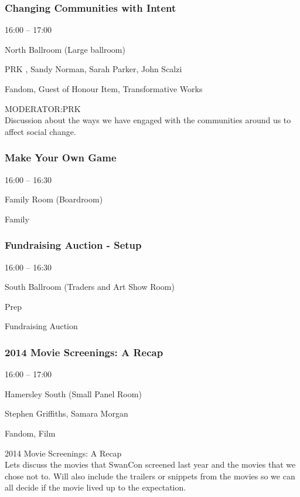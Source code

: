 \documentclass{scrreprt}
\begin{document}
\begin{multicols}{2}
\subsubsection*{Changing Communities with Intent}\begin{description}
\setlength{\itemsep}{0pt}
\setlength{\parsep}{0pt}
\setlength{\parskip}{0pt}
\item[Time:]{16:00 -- 17:00}
\item[Venue:]{North Ballroom (Large ballroom)}
\item[People:]{PRK , Sandy Norman, Sarah Parker, John Scalzi}
\item[Tags:]{Fandom, Guest of Honour Item, Transformative Works}\end{description}
MODERATOR:PRK\\Discussion about the ways we have engaged with the communities around us to affect social change.
\subsubsection*{Make Your Own Game}\begin{description}
\setlength{\itemsep}{0pt}
\setlength{\parsep}{0pt}
\setlength{\parskip}{0pt}
\item[Time:]{16:00 -- 16:30}
\item[Venue:]{Family Room (Boardroom)}
\item[Tags:]{Family}\end{description}

\subsubsection*{Fundraising Auction - Setup}\begin{description}
\setlength{\itemsep}{0pt}
\setlength{\parsep}{0pt}
\setlength{\parskip}{0pt}
\item[Time:]{16:00 -- 16:30}
\item[Venue:]{South Ballroom (Traders and Art Show Room)}
\item[Tags:]{Prep}\end{description}
Fundraising Auction
\subsubsection*{2014 Movie Screenings: A Recap}\begin{description}
\setlength{\itemsep}{0pt}
\setlength{\parsep}{0pt}
\setlength{\parskip}{0pt}
\item[Time:]{16:00 -- 17:00}
\item[Venue:]{Hamersley South (Small Panel Room)}
\item[People:]{Stephen Griffiths, Samara Morgan}
\item[Tags:]{Fandom, Film}\end{description}
2014 Movie Screenings: A Recap\\Lets discuss the movies that SwanCon screened last year and the movies that we chose not to. Will also include the trailers or snippets from the movies so we can all decide if the movie lived up to the expectation.

\end{multicols}
\end{document}
